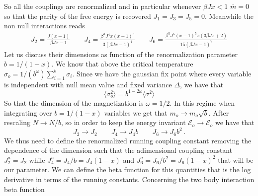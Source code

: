 \documentclass[aps,pre,noshowpacs]{revtex4}
\begin{document}
So all the couplings are renormalized and in particular whenever $\beta J x<1$ $\overline{m}=0$ so that the parity of the free energy is recovered $J_1=J_3=J_5=0$. Meanwhile the non null interactions reads
\begin{eqnarray}
J_2= \frac{J (x-1)}{\beta  J x-1} \qquad J_4=\frac{\beta ^3 J^4 x (x-1)^3 }{3 (\beta  J x-1)^4} \qquad J_6 = \frac{\beta ^5 J^6 (x-1)^5 x (3 \beta  J x+2)}{15 (\beta  J x-1)^7}
\end{eqnarray}
Let us discuss their dimensions as function of the renormalization parameter $b=1/(1-x)$. We know that above the critical temperature $\sigma_o=1/(b^{\omega}) \sum_{i=1}^{b} \sigma_i $. Since we have the gaussian fix point  where every variable is independent with null mean value and fixed variance $\Delta$, we have that $$\langle \sigma_o^2\rangle = b^{1-2 \omega} \langle \sigma^2\rangle $$ So that the dimension of the magnetization is $\omega=1/2$. In this regime when integrating over $b=1/(1-x)$ variables we get that $m_o \to m_o \sqrt{b}$. After rescaling $N \to N /b$, so in order to keep the energy invariant $\mathcal{E}_o \to \mathcal{E}_o$ we have that
$$J_2 \to J_2  \qquad J_4 \to  J_4 b \qquad J_6 \to J_6 b^2\,.$$
We thus need to define the renormalized running coupling constant removing the dependence of the dimension such that the adimensional coupling constant $J^a_2=J_2$ while $J^a_4=J_4 / b=J_4 (1-x) $ and $J^a_6=J_6 /b^2=J_6(1-x)^2$ that will be our
parameter. We can define the beta function for this quantities that is the log derivative in terms of the running constants. Concerning the two body interaction beta function
\end{document}
